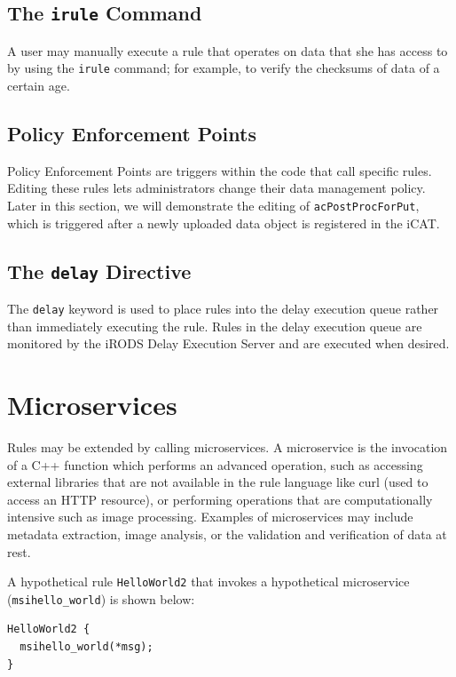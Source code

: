 \documentclass[10pt,oneside]{memoir}
\begin{document}
\subsection{The \texttt{irule} Command}

A user may manually execute a rule that operates on data that she has access to by using the \texttt{irule} command; for example, to verify the checksums of data of a certain age.

\subsection{Policy Enforcement Points}

Policy Enforcement Points are triggers within the code that call specific rules. Editing these rules lets administrators change their data management policy. Later in this section, we will demonstrate the editing of \texttt{acPostProcForPut}, which is triggered after a newly uploaded data object is registered in the iCAT.

\subsection{The \texttt{delay} Directive}

The \texttt{delay} keyword is used to place rules into the delay execution queue rather than immediately executing the rule. Rules in the delay execution queue are monitored by the iRODS Delay Execution Server and are executed when desired.

\section{Microservices}

Rules may be extended by calling microservices. A microservice is the invocation of a C++ function which performs an advanced operation, such as accessing external libraries that are not available in the rule language like curl (used to access an HTTP resource), or performing operations that are computationally intensive such as image processing. Examples of microservices may include metadata extraction, image analysis, or the validation and verification of data at rest.

A hypothetical rule \texttt{HelloWorld2} that invokes a hypothetical microservice (\texttt{msihello\_world}) is shown below:

\begin{lstlisting}
HelloWorld2 {
  msihello_world(*msg);
}
\end{lstlisting}
\end{document}
